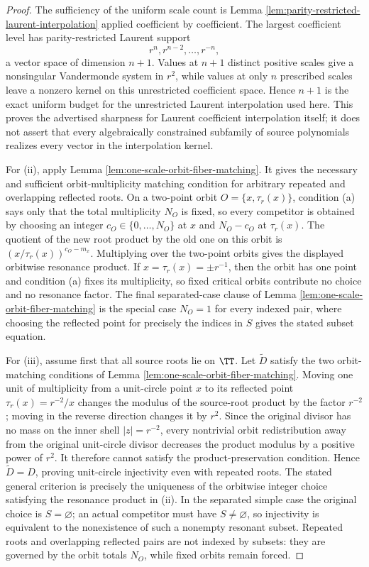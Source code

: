 \begin{proof}
The sufficiency of the uniform scale count is Lemma \ref{lem:parity-restricted-laurent-interpolation} applied coefficient by coefficient.  The largest coefficient level has parity-restricted Laurent support
\[
r^n,r^{n-2},\dots,r^{-n},
\]
a vector space of dimension \(n+1\).  Values at \(n+1\) distinct positive scales give a nonsingular Vandermonde system in \(r^2\), while values at only \(n\) prescribed scales leave a nonzero kernel on this unrestricted coefficient space.  Hence \(n+1\) is the exact uniform budget for the unrestricted Laurent interpolation used here.  This proves the advertised sharpness for Laurent coefficient interpolation itself; it does not assert that every algebraically constrained subfamily of source polynomials realizes every vector in the interpolation kernel.

For (ii), apply Lemma \ref{lem:one-scale-orbit-fiber-matching}.  It gives the necessary and sufficient orbit-multiplicity matching condition for arbitrary repeated and overlapping reflected roots.  On a two-point orbit \(O=\{x,\tau_r(x)\}\), condition \textup{(a)} says only that the total multiplicity \(N_O\) is fixed, so every competitor is obtained by choosing an integer \(c_O\in\{0,\dots,N_O\}\) at \(x\) and \(N_O-c_O\) at \(\tau_r(x)\).  The quotient of the new root product by the old one on this orbit is \((x/\tau_r(x))^{c_O-m_x}\).  Multiplying over the two-point orbits gives the displayed orbitwise resonance product.  If \(x=\tau_r(x)=\pm r^{-1}\), then the orbit has one point and condition \textup{(a)} fixes its multiplicity, so fixed critical orbits contribute no choice and no resonance factor.  The final separated-case clause of Lemma \ref{lem:one-scale-orbit-fiber-matching} is the special case \(N_O=1\) for every indexed pair, where choosing the reflected point for precisely the indices in \(S\) gives the stated subset equation.

For (iii), assume first that all source roots lie on \(\TT\).  Let \(\widetilde D\) satisfy the two orbit-matching conditions of Lemma \ref{lem:one-scale-orbit-fiber-matching}.  Moving one unit of multiplicity from a unit-circle point \(x\) to its reflected point \(\tau_r(x)=r^{-2}/x\) changes the modulus of the source-root product by the factor \(r^{-2}\); moving in the reverse direction changes it by \(r^2\).  Since the original divisor has no mass on the inner shell \(|z|=r^{-2}\), every nontrivial orbit redistribution away from the original unit-circle divisor decreases the product modulus by a positive power of \(r^2\).  It therefore cannot satisfy the product-preservation condition.  Hence \(\widetilde D=D\), proving unit-circle injectivity even with repeated roots.  The stated general criterion is precisely the uniqueness of the orbitwise integer choice satisfying the resonance product in (ii).  In the separated simple case the original choice is \(S=\varnothing\); an actual competitor must have \(S\ne\varnothing\), so injectivity is equivalent to the nonexistence of such a nonempty resonant subset.  Repeated roots and overlapping reflected pairs are not indexed by subsets: they are governed by the orbit totals \(N_O\), while fixed orbits remain forced.
\end{proof}


